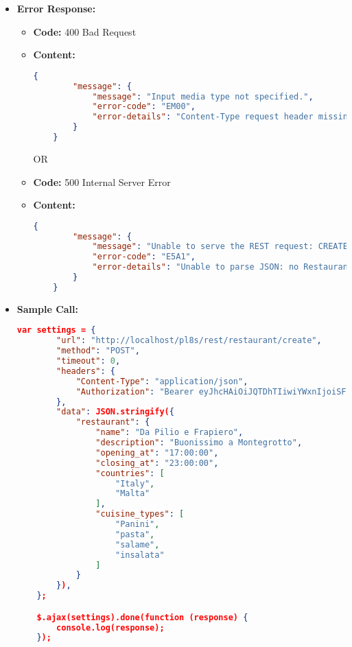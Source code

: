 \begin{itemize}
    \item \textbf{Error Response:}
    	\begin{itemize}
			\item[$\circ$] \textbf{Code:} 400 Bad Request
			\item[] \textbf{Content:}
			\begin{lstlisting}[language=json]
	{
		"message": {
			"message": "Input media type not specified.",
			"error-code": "EM00",
			"error-details": "Content-Type request header missing."
		}
	}
			\end{lstlisting}
OR
			\item[$\circ$] \textbf{Code:} 500 Internal Server Error
			\item[] \textbf{Content:}
			\begin{lstlisting}[language=json]
	{
		"message": {
			"message": "Unable to serve the REST request: CREATE_RESTAURANT.",
			"error-code": "E5A1",
			"error-details": "Unable to parse JSON: no Restaurant object found."
		}
	}
			\end{lstlisting}
		\end{itemize}
    \item \textbf{Sample Call:}
		\medskip
		\begin{lstlisting}[language=json]
	var settings = {
	    "url": "http://localhost/pl8s/rest/restaurant/create",
	    "method": "POST",
	    "timeout": 0,
	    "headers": {
	        "Content-Type": "application/json",
	        "Authorization": "Bearer eyJhcHAiOiJQTDhTIiwiYWxnIjoiSFM1MTIifQ.eyJ1aWQiOjIsInJvbCI6Im1hbmFnZXIiLC JzdHIiOiJjdXNfUHc4cUNVWTg4V2gyMG4iLCJkYXQiOjE3MTQyMjk0NzEzNTh9.83I0YU5yV5 LJA4m4O_VQ1oPtUao40x76nV5FUzocGCOde0ijfe0cVq7BkSvre9--KsgNqgg2eX6jWpquIDB MAA"	    
	    },
	    "data": JSON.stringify({
	        "restaurant": {
	            "name": "Da Pilio e Frapiero",
	            "description": "Buonissimo a Montegrotto",
	            "opening_at": "17:00:00",
	            "closing_at": "23:00:00",
	            "countries": [
	                "Italy",
	                "Malta"
	            ],
	            "cuisine_types": [
	                "Panini",
	                "pasta",
	                "salame",
	                "insalata"
	            ]
	        }
	    }),
	};

	$.ajax(settings).done(function (response) {
	    console.log(response);
	});
		\end{lstlisting}
    
\end{itemize}

